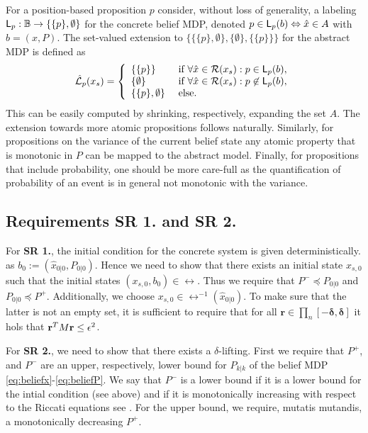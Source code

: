 \documentclass{ifacconf}
\begin{document}
For a position-based proposition $p$ consider, without loss of generality, a labeling $\mathsf{L}_p: \mathbb{B} \rightarrow \{\{p\},\emptyset\}$ for the concrete belief MDP, denoted
$p\in\mathsf{L}_p(b)  \Leftrightarrow \hat x \in A$ with $b=(x,P)$.  The set-valued extension to $\{ \{\{p\},\emptyset\},\{\emptyset\}, \{\{p\}\} \}$
 for the abstract MDP is defined as
 \begin{align}
 	\hat {\mathcal{L}}_p(x_s) =\left\{\begin{array}{ll} \{\{p\}\} & \mbox{ if } \forall \hat x \in \mathcal{R} (x_s):p\in\mathsf{L}_p(b), \\
 	  \{\emptyset \} & \mbox{ if } \forall \hat x \in \mathcal{R} (x_s):p\not\in\mathsf{L}_p(b),\\
 	  \{\{p\},\emptyset\}&\mbox{ else.}\end{array} \right.
 \end{align}
This can be easily computed by shrinking, respectively, expanding the set $A$.  The extension towards more atomic propositions follows naturally.
Similarly, for propositions on the variance of the current belief state any atomic property that is monotonic in $P$ can be mapped to the abstract model.
Finally, for propositions that include probability, one should be more care-full as the quantification of probability of an event is in general not monotonic with the variance.

 
  
  
\subsection{Requirements {\bf SR 1.} and {\bf SR 2.}}
For  {\bf SR 1.}, the initial condition  for the concrete system is given deterministically. as $b_0:=(\hat x_{0|0}, P_{0|0})$. Hence we need to show that there exists an initial state $x_{s,0}$ such that the initial states $(x_{s,0},b_0)\in \rel$.  Thus we require that 
$P^-\preceq  P_{0|0} $ and  $P_{0|0}\preceq P^+$.  Additionally, we choose $x_{s,0}\in \rel^{-1}(\hat x_{0|0})$.    To make sure that the latter is not an empty set, it is sufficient to require that for all $\mathbf r \in \prod_n[-\boldsymbol \delta, \boldsymbol \delta]$ it hols that $ \mathbf r ^T M \mathbf r \leq \epsilon^2$.
 
 For  {\bf SR 2.},  we need to show that there exists a $\delta$-lifting. 
First we require that $P^+$, and $P^-$ are an upper, respectively, lower bound for $P_{k|k}$ of the belief MDP \eqref{eq:beliefx}-\eqref{eq:beliefP}.  We say that $P^-$ is a lower bound if it is a lower bound for the intial condition (see above) and   if it is monotonically increasing with respect to the Riccati equations see \citep{bitmead1985monotonicity}. For the upper bound, we require, mutatis mutandis, a monotonically decreasing $P^+$. 
\end{document}
